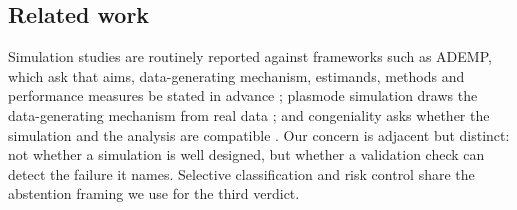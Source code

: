 \subsection{Related work}
Simulation studies are routinely reported against frameworks such as ADEMP, which
ask that aims, data-generating mechanism, estimands, methods and performance
measures be stated in advance \cite{morris2019}; plasmode simulation draws the
data-generating mechanism from real data \cite{franklin2014}; and congeniality
asks whether the simulation and the analysis are compatible \cite{meng1994}. Our
concern is adjacent but distinct: not whether a simulation is well designed, but
whether a validation check can detect the failure it names. Selective
classification and risk control \cite{geifman2017,elyaniv2010} share the
abstention framing we use for the third verdict.
